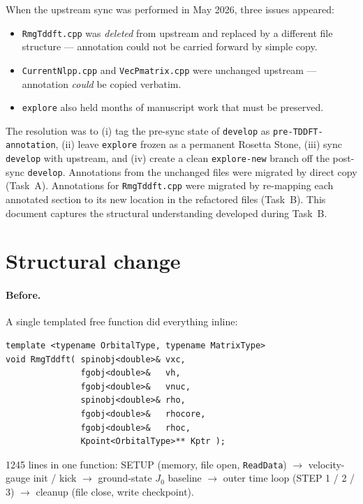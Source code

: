 \documentclass[11pt,letterpaper]{article}
\begin{document}
When the upstream sync was performed in May 2026, three issues appeared:
\begin{itemize}[leftmargin=*]
  \item \texttt{RmgTddft.cpp} was \emph{deleted} from upstream and replaced
        by a different file structure --- annotation could not be carried
        forward by simple copy.
  \item \texttt{CurrentNlpp.cpp} and \texttt{VecPmatrix.cpp} were unchanged
        upstream --- annotation \emph{could} be copied verbatim.
  \item \texttt{explore} also held months of manuscript work that must be
        preserved.
\end{itemize}
The resolution was to (i) tag the pre-sync state of \texttt{develop} as
\texttt{pre-TDDFT-annotation}, (ii) leave \texttt{explore} frozen as a
permanent Rosetta Stone, (iii) sync \texttt{develop} with upstream, and
(iv) create a clean \texttt{explore-new} branch off the post-sync
\texttt{develop}.  Annotations from the unchanged files were migrated by
direct copy (Task~A).  Annotations for \texttt{RmgTddft.cpp} were migrated
by re-mapping each annotated section to its new location in the refactored
files (Task~B).  This document captures the structural understanding
developed during Task~B.

\section{Structural change}
\label{sec:structure}

\paragraph{Before.}  A single templated free function did everything
inline:
\begin{lstlisting}[style=cppstyle]
template <typename OrbitalType, typename MatrixType>
void RmgTddft( spinobj<double>& vxc,
               fgobj<double>&   vh,
               fgobj<double>&   vnuc,
               spinobj<double>& rho,
               fgobj<double>&   rhocore,
               fgobj<double>&   rhoc,
               Kpoint<OrbitalType>** Kptr );
\end{lstlisting}
1245 lines in one function: SETUP (memory, file open, \texttt{ReadData})
$\to$ velocity-gauge init / kick $\to$ ground-state $J_0$ baseline $\to$
outer time loop (STEP 1 / 2 / 3) $\to$ cleanup (file close, write
checkpoint).
\end{document}
